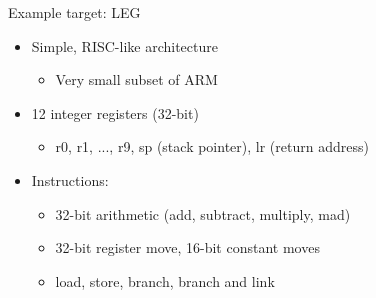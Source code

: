 \begin{frame}{Example target: LEG}

\begin{itemize}
    \item Simple, RISC-like architecture
    \begin{itemize}
        \item Very small subset of ARM
    \end{itemize}
    \item 12 integer registers (32-bit)
    \begin{itemize}
        \item r0, r1, ..., r9, sp (stack pointer), lr (return address)
    \end{itemize}
    \item Instructions:
    \begin{itemize}
        \item 32-bit arithmetic (add, subtract, multiply, mad)
        \item 32-bit register move, 16-bit constant moves
        \item load, store, branch, branch and link
    \end{itemize}
\end{itemize}

\end{frame}


